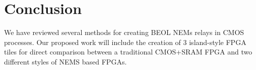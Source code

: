 \documentclass[twoside,twocolumn]{article}
\begin{document}
\section{Conclusion}
We have reviewed several methods for creating BEOL NEMs relays in CMOS processes. 
Our proposed work will include the creation of 3 island-style FPGA tiles for 
direct comparison between a traditional CMOS+SRAM FPGA and two different styles
of NEMS based FPGAs.





\end{document}
